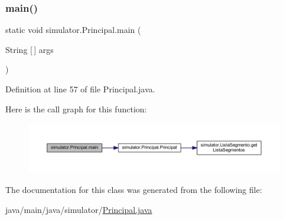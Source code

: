 \subsubsection{\texorpdfstring{main()}{main()}}
{\footnotesize\ttfamily static void simulator.\+Principal.\+main (\begin{DoxyParamCaption}\item[{String \mbox{[}$\,$\mbox{]}}]{args }\end{DoxyParamCaption})\hspace{0.3cm}{\ttfamily [static]}}



Definition at line 57 of file Principal.\+java.

Here is the call graph for this function\+:\nopagebreak
\begin{figure}[H]
\begin{center}
\leavevmode
\includegraphics[width=350pt]{classsimulator_1_1_principal_a472c3314a2ab8e7eff9c2539b7818a22_cgraph}
\end{center}
\end{figure}


The documentation for this class was generated from the following file\+:\begin{DoxyCompactItemize}
\item 
java/main/java/simulator/\mbox{\hyperlink{_principal_8java}{Principal.\+java}}\end{DoxyCompactItemize}
